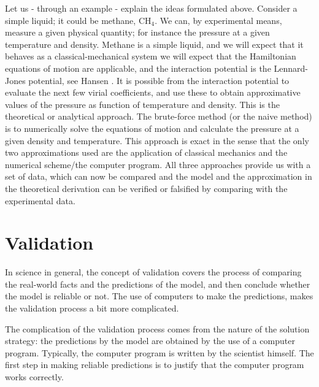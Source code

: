 Let us - through an example - explain the ideas formulated
above. Consider a simple liquid; it could be methane,
$\mathrm{CH}_4$. We can, by experimental means, measure a given physical
quantity; for instance the pressure at a given temperature and
density. Methane is a simple liquid, and we will expect that it
behaves as a classical-mechanical system \ie we will expect that the
Hamiltonian equations of motion are applicable, and the interaction
potential is the Lennard-Jones potential, see \eg Hansen \etal
\cite{Hansen86}. It is possible from the interaction potential to
evaluate the next few virial coefficients, and use these to obtain
approximative values of the pressure as function of temperature and
density. This is the theoretical or analytical approach. The
brute-force method (or the naive method) is to numerically solve
the equations of motion and calculate the pressure at a given density
and temperature. This approach is exact in the sense that the only two
approximations used are the application of classical mechanics and the
numerical scheme/the computer program. All three approaches
provide us with a set of data, which can now be compared and the model
and the approximation in the theoretical derivation can be verified or
falsified by comparing with the experimental data.


\section{Validation}
\label{sect:ModelValid}
In science in general, the concept of validation covers the process of
comparing the real-world facts and the predictions of the model, and
then conclude whether the model is reliable or not. The use of
computers to make the predictions, makes the validation process a bit
more complicated.

The complication of the validation process comes from the nature of
the solution strategy: the predictions by the model are obtained by
the use of a computer program. Typically, the computer program is
written by the scientist himself. The first step in making reliable
predictions is to justify that the computer program works correctly. 


